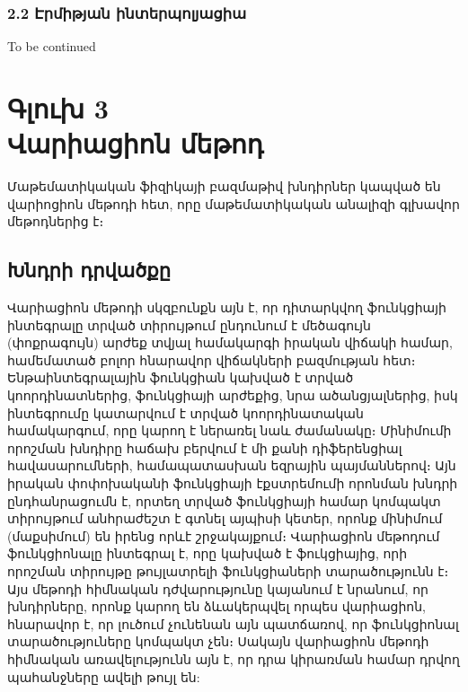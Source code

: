\documentclass[fleqn, bachelor,subf,12pt,notitlepage]{article}
\begin{document}
\subsubsection*{2.2 Էրմիթյան ինտերպոլյացիա}
To be continued
\newpage
\section*{\centering Գլուխ 3 \\ Վարիացիոն մեթոդ}
\setcounter{equation}{0}

Մաթեմատիկական ֆիզիկայի բազմաթիվ խնդիրներ կապված են վարիոցիոն մեթոդի հետ, որը մաթեմատիկական անալիզի գլխավոր մեթոդներից է։

\subsection*{Խնդրի դրվածքը}
\hspace{\parindent}Վարիացիոն մեթոդի սկզբունքն այն է, որ դիտարկվող ֆունկցիայի ինտեգրալը տրված տիրույթում ընդունում է մեծագույն (փոքրագույն) արժեք տվյալ համակարգի իրական վիճակի համար, համեմատած բոլոր հնարավոր վիճակների բազմության հետ։  Ենթաինտեգրալային ֆունկցիան կախված է տրված կոորդինատներից, ֆունկցիայի արժեքից, նրա ածանցյալներից, իսկ ինտեգրումը կատարվում է տրված կոորդինատական համակարգում, որը կարող է ներառել նաև ժամանակը։ Մինիմումի որոշման խնդիրը հաճախ բերվում է մի քանի դիֆերենցիալ հավասարումների, համապատասխան եզրային պայմաններով։  Այն իրական փոփոխականի ֆունկցիայի էքստրեմումի որոնման խնդրի ընդհանրացումն է, որտեղ տրված ֆունկցիայի համար կոմպակտ տիրույթում անհրաժեշտ է գտնել այպիսի կետեր, որոնք մինիմում (մաքսիմում) են իրենց որևէ շրջակայքում։
Վարիացիոն մեթոդում ֆունկցիոնալը ինտեգրալ է, որը կախված է ֆուկցիայից, որի որոշման տիրույթը թույլատրելի ֆունկցիաների  տարածությունն է։
Այս  մեթոդի հիմնական դժվարությունը կայանում է նրանում, որ խնդիրները, որոնք կարող են ձևակերպվել որպես վարիացիոն, հնարավոր է, որ լուծում չունենան այն պատճառով, որ ֆունկցիոնալ տարածություները  կոմպակտ չեն։
Սակայն վարիացիոն մեթոդի հիմնական առավելությունն այն է, որ դրա կիրառման համար դրվող պահանջները ավելի թույլ են:
\newpage
\end{document}
